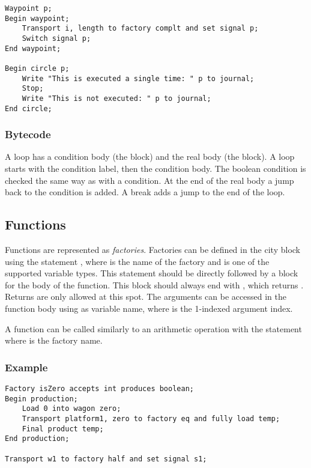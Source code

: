 \begin{lstlisting}
Waypoint p;
Begin waypoint;
	Transport i, length to factory complt and set signal p;
	Switch signal p;
End waypoint;

Begin circle p;
	Write "This is executed a single time: " p to journal;
	Stop;
	Write "This is not executed: " p to journal;
End circle;
\end{lstlisting}

\subsubsection*{Bytecode}

A loop has a condition body (the  block) and the real body (the  block). A loop starts with the condition label, then the condition body. The boolean condition is checked the same way as with a condition. At the end of the real body a jump back to the condition is added. A break adds a jump to the end of the loop.

\subsection{Functions}

Functions are represented as \emph{factories}. Factories can be defined in the  city block using the statement , where  is the name of the factory and  is one of the supported variable types. This statement should be directly followed by a  block for the body of the function. This block should always end with , which returns . Returns are only allowed at this spot. The arguments can be accessed in the function body using  as variable name, where  is the 1-indexed argument index.

A function can be called similarly to an arithmetic operation with the  statement where  is the factory name.

\subsubsection*{Example}

\begin{lstlisting}
Factory isZero accepts int produces boolean;
Begin production;
	Load 0 into wagon zero;
	Transport platform1, zero to factory eq and fully load temp;
	Final product temp;
End production;

Transport w1 to factory half and set signal s1;
\end{lstlisting}

